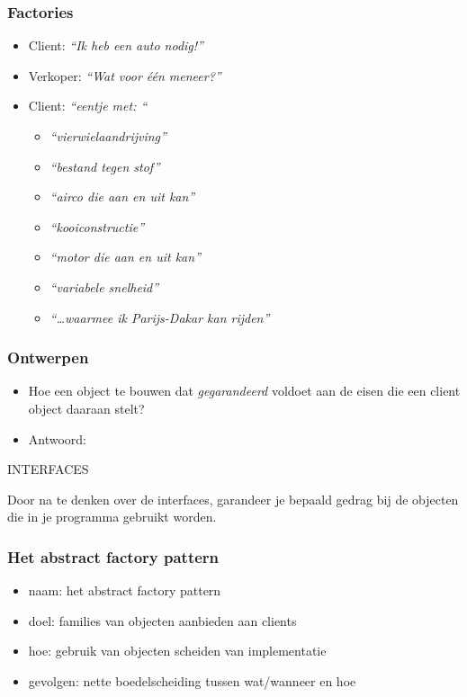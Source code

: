 \documentclass{beamer}
\begin{document}
\begin{frame}
\frametitle{Factories}
\begin{itemize}
\item Client: \emph{``Ik heb een auto nodig!''}\pause
\item Verkoper: \emph{``Wat voor \'e\'en meneer?''}\pause
\item Client: \emph{``eentje met: ``}
  \begin{itemize}
  \item \emph{``vierwielaandrijving''}\pause
  \item \emph{``bestand tegen stof''}\pause
  \item \emph{``airco die aan en uit kan''}\pause
  \item \emph{``kooiconstructie''}\pause
  \item \emph{``motor die aan en uit kan''}
  \item \emph{``variabele snelheid''}
  \item \emph{``\ldots waarmee ik Parijs-Dakar kan rijden''}
  \end{itemize}
\end{itemize}
\end{frame}

\begin{frame}
\frametitle{Ontwerpen}
\begin{itemize}
\item Hoe een object te bouwen dat \emph{gegarandeerd} voldoet aan de eisen die een client object daaraan stelt?\pause
\item Antwoord:
\end{itemize}
\begin{center}
  \huge{INTERFACES}
\end{center}
Door na te denken over de interfaces, garandeer je bepaald gedrag bij de objecten die in je programma gebruikt worden. 
\end{frame}

\begin{frame}
\frametitle{Het abstract factory pattern}
\begin{itemize}
\item naam: het abstract factory pattern
\item doel: families van objecten aanbieden aan clients
\item hoe: gebruik van objecten scheiden van implementatie
\item gevolgen: nette boedelscheiding tussen wat/wanneer en hoe
\end{itemize}
\end{frame}
\end{document}

